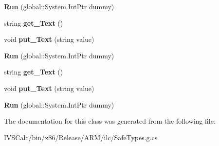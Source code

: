 \begin{DoxyCompactItemize}
\item 
\mbox{\label{class_windows_1_1_u_i_1_1_xaml_1_1_documents_1_1_run_abdda5016b75eb3a9e363b5814c1995b8}} 
{\bfseries Run} (global\+::\+System.\+Int\+Ptr dummy)
\item 
\mbox{\label{class_windows_1_1_u_i_1_1_xaml_1_1_documents_1_1_run_a3be38a08ebfb4ecbc07e5f1c5ab9e154}} 
string {\bfseries get\+\_\+\+Text} ()
\item 
\mbox{\label{class_windows_1_1_u_i_1_1_xaml_1_1_documents_1_1_run_af6d0fe4d19a0dd3ce2ae777e198d82ee}} 
void {\bfseries put\+\_\+\+Text} (string value)
\item 
\mbox{\label{class_windows_1_1_u_i_1_1_xaml_1_1_documents_1_1_run_abdda5016b75eb3a9e363b5814c1995b8}} 
{\bfseries Run} (global\+::\+System.\+Int\+Ptr dummy)
\item 
\mbox{\label{class_windows_1_1_u_i_1_1_xaml_1_1_documents_1_1_run_a3be38a08ebfb4ecbc07e5f1c5ab9e154}} 
string {\bfseries get\+\_\+\+Text} ()
\item 
\mbox{\label{class_windows_1_1_u_i_1_1_xaml_1_1_documents_1_1_run_af6d0fe4d19a0dd3ce2ae777e198d82ee}} 
void {\bfseries put\+\_\+\+Text} (string value)
\item 
\mbox{\label{class_windows_1_1_u_i_1_1_xaml_1_1_documents_1_1_run_abdda5016b75eb3a9e363b5814c1995b8}} 
{\bfseries Run} (global\+::\+System.\+Int\+Ptr dummy)
\end{DoxyCompactItemize}


The documentation for this class was generated from the following file\+:\begin{DoxyCompactItemize}
\item 
I\+V\+S\+Calc/bin/x86/\+Release/\+A\+R\+M/ilc/Safe\+Types.\+g.\+cs\end{DoxyCompactItemize}
